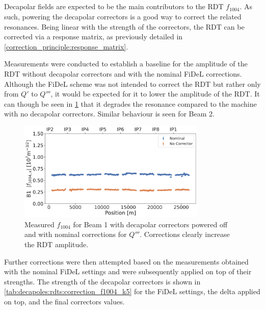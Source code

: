 \subsection{}
\label{section:decapoles:decapolar_contribution_correction}

Decapolar fields are expected to be the main contributors to the RDT $f_{1004}$. As such, powering
the decapolar correctors is a good way to correct the related resonances.
Being linear with the strength of the correctors, the RDT can be corrected via a response matrix,
as previously detailed in \cref{correction_principle:response_matrix}.

Measurements were conducted to establish a baseline for the amplitude of the RDT without decapolar
correctors and with the nominal FiDeL corrections.
Although the FiDeL scheme was not intended to correct the RDT but rather only from $Q'$ to $Q'''$,
it would be expected for it to lower the amplitude of the RDT. It can though be seen in 
\cref{fig:decapoles:rdts:f1004_correction_B1_fidel_vs_bare} that it degrades the resonance compared
to the machine with no decapolar correctors. Similar behaviour is seen for Beam 2. 

\begin{figure}[!htb]
    \includegraphics[width=0.8\textwidth]{./images/f1004/f1004x_corrections_B1_fidel_vs_bare.pdf}
    \caption{Measured $f_{1004}$ for Beam 1 with decapolar correctors powered off and with nominal
    corrections for $Q'''$. Corrections clearly increase the RDT amplitude.}
    \label{fig:decapoles:rdts:f1004_correction_B1_fidel_vs_bare}
\end{figure}

Further corrections were then attempted based on the measurements obtained with the nominal FiDeL
settings and were subsequently applied on top of their strengths.
The strength of the decapolar correctors is shown in \cref{tab:decapoles:rdts:correction_f1004_k5}
for the FiDeL settings, the delta applied on top, and the final correctors values.

